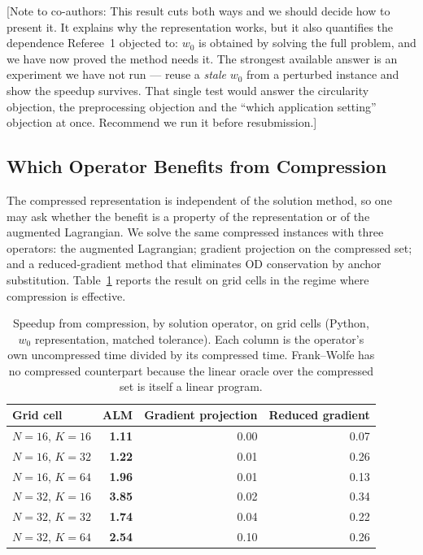 \documentclass[11pt]{article}
\newcommand{\conote}[1]{{\color{red}\small\textsf{[Note to co-authors: #1]}}}
\begin{document}
\conote{This result cuts both ways and we should decide how to present it. It explains why the
representation works, but it also quantifies the dependence Referee~1 objected to: $w_0$ is
obtained by solving the full problem, and we have now proved the method needs it. The
strongest available answer is an experiment we have not run --- reuse a \emph{stale} $w_0$
from a perturbed instance and show the speedup survives. That single test would answer the
circularity objection, the preprocessing objection and the ``which application setting''
objection at once. Recommend we run it before resubmission.}


\subsection{Which Operator Benefits from Compression}
\label{sec:operator-study}


The compressed representation is independent of the solution method, so one may ask whether
the benefit is a property of the representation or of the augmented Lagrangian. We solve the
same compressed instances with three operators: the augmented Lagrangian; gradient projection
on the compressed set; and a reduced-gradient method that eliminates OD conservation by
anchor substitution. Table~\ref{tab:operator-compression} reports the result on grid cells in
the regime where compression is effective.

\begin{table}[h]
\centering
\caption{Speedup from compression, by solution operator, on grid cells
(Python, $w_0$ representation, matched tolerance). Each column is the operator's own
uncompressed time divided by its compressed time. Frank--Wolfe has no compressed counterpart
because the linear oracle over the compressed set is itself a linear program.}
\label{tab:operator-compression}
{\small
\begin{tabular}{lrrr}
\toprule
Grid cell & ALM & Gradient projection & Reduced gradient\\
\midrule
$N=16$, $K=16$ & \textbf{1.11} & 0.00 & 0.07\\
$N=16$, $K=32$ & \textbf{1.22} & 0.01 & 0.26\\
$N=16$, $K=64$ & \textbf{1.96} & 0.01 & 0.13\\
$N=32$, $K=16$ & \textbf{3.85} & 0.02 & 0.34\\
$N=32$, $K=32$ & \textbf{1.74} & 0.04 & 0.22\\
$N=32$, $K=64$ & \textbf{2.54} & 0.10 & 0.26\\
\bottomrule
\end{tabular}}
\end{table}
\end{document}
